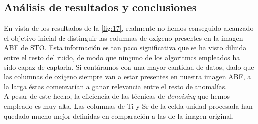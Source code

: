 \subsection{Análisis de resultados y conclusiones}

En vista de los resultados de la \autoref{fig:17}, realmente no hemos conseguido alcanzado el objetivo inicial de distinguir las columnas de oxígeno presentes en la imagen ABF de STO. Esta información es tan poco significativa que se ha visto diluida entre el resto del ruido, de modo que ninguno de los algoritmos empleados ha sido capaz de captarla. Si contáramos con una mayor cantidad de datos, dado que las columnas de oxígeno siempre van a estar presentes en nuestra imagen ABF, a la larga éstas comenzarían a ganar relevancia entre el resto de anomalías.\\

A pesar de este hecho, la eficiencia de las técnicas de \textit{denoising} que hemos empleado es muy alta. Las columnas de Ti y Sr de la celda unidad procesada han quedado mucho mejor definidas en comparación a las de la imagen original. 
